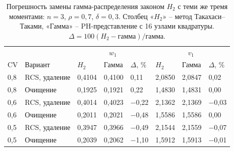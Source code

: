 
\begin{table}[!htbp]
\centering\small\setlength{\tabcolsep}{3pt}
\begin{tabular}{@{}p{1.0cm}p{3.2cm}p{1.6cm}p{1.6cm}p{1.3cm}p{1.6cm}p{1.6cm}p{1.3cm}@{}}
\toprule
 & & \multicolumn{3}{c}{$w_1$} & \multicolumn{3}{c}{$v_1$} \\
$\mathrm{CV}$ & Вариант & $H_2$ & Гамма & $\Delta$, \% & $H_2$ & Гамма & $\Delta$, \% \\
\midrule
0,8 & RCS, удаление & 0,4104 & 0,4100 & 0,11 & 2,0850 & 2,0847 & 0,02 \\
0,8 & Очищение & 0,1925 & 0,1921 & 0,22 & 1,4830 & 1,4831 & 0,00 \\
0,6 & RCS, удаление & 0,4014 & 0,4023 & −0,22 & 2,1362 & 2,1369 & −0,03 \\
0,6 & Очищение & 0,2011 & 0,2021 & −0,48 & 1,5586 & 1,5586 & 0,00 \\
0,5 & RCS, удаление & 0,3947 & 0,3966 & −0,49 & 2,1544 & 2,1559 & −0,07 \\
0,5 & Очищение & 0,2039 & 0,2062 & −1,10 & 1,5912 & 1,5913 & −0,01 \\
\bottomrule
\end{tabular}
\caption{Погрешность замены гамма-распределения законом \(H_2\) с теми же тремя моментами: \(n=3\), \(\rho=0{,}7\), \(\delta=0{,}3\). Столбец «\(H_2\)» -- метод Такахаси--Таками, «Гамма» -- PH-представление с 16 узлами квадратуры. \(\Delta=100(H_2-\text{гамма})/\text{гамма}\).}
\label{tab:law}
\end{table}
